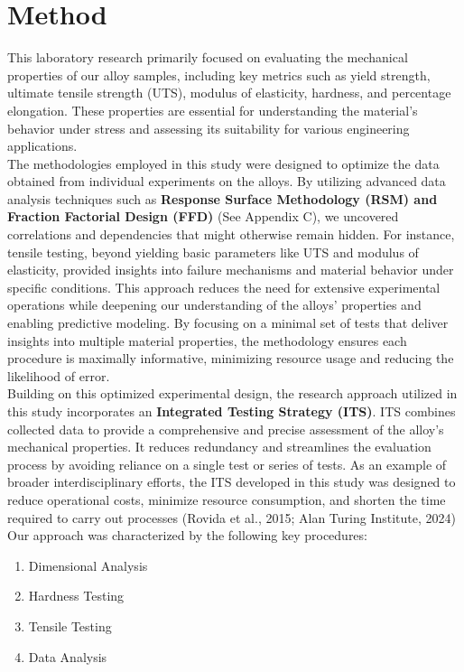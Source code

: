 \documentclass{article}
\begin{document}
\section{Method}
This laboratory research primarily focused on evaluating the mechanical properties of our alloy samples, including key metrics such as yield strength, ultimate tensile strength (UTS), modulus of elasticity, hardness, and percentage elongation. These properties are essential for understanding the material's behavior under stress and assessing its suitability for various engineering applications.\\[8pt]
The methodologies employed in this study were designed to optimize the data obtained from individual experiments on the alloys. By utilizing advanced data analysis techniques such as \textbf{Response Surface Methodology (RSM) and Fraction Factorial Design (FFD)} (See Appendix C), we uncovered correlations and dependencies that might otherwise remain hidden. For instance, tensile testing, beyond yielding basic parameters like UTS and modulus of elasticity, provided insights into failure mechanisms and material behavior under specific conditions. This approach reduces the need for extensive experimental operations while deepening our understanding of the alloys' properties and enabling predictive modeling. By focusing on a minimal set of tests that deliver insights into multiple material properties, the methodology ensures each procedure is maximally informative, minimizing resource usage and reducing the likelihood of error.\\[8pt]
Building on this optimized experimental design, the research approach utilized in this study incorporates an \textbf{Integrated Testing Strategy (ITS)}. ITS combines collected data to provide a comprehensive and precise assessment of the alloy's mechanical properties. It reduces redundancy and streamlines the evaluation process by avoiding reliance on a single test or series of tests. As an example of broader interdisciplinary efforts, the ITS developed in this study was designed to reduce operational costs, minimize resource consumption, and shorten the time required to carry out processes (Rovida et al., 2015; Alan Turing Institute, 2024)\\[8pt]
Our approach was characterized by the following key procedures:
\begin{enumerate}[itemsep=-0.5mm]
    \item Dimensional Analysis
    \item Hardness Testing
    \item Tensile Testing 
    \item Data Analysis
\end{enumerate}
\end{document}
